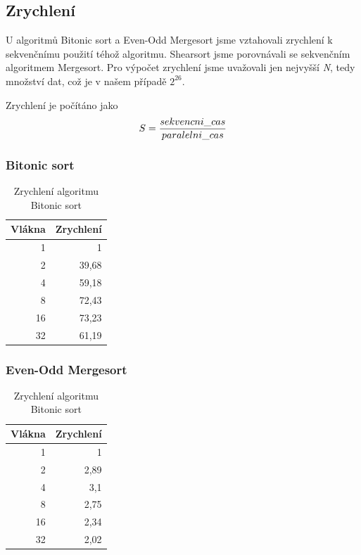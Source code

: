 \documentclass[12pt]{article}
\begin{document}
\subsection{Zrychlení}
U algoritmů Bitonic sort a Even-Odd Mergesort jsme vztahovali zrychlení k sekvenčnímu použití téhož algoritmu.
Shearsort jsme porovnávali se sekvenčním algoritmem Mergesort. Pro výpočet zrychlení jsme uvažovali jen
nejvyšší \emph{N}, tedy množství dat, což je v našem případě \(2^{26}\).

Zrychlení je počítáno jako $$S = {{sekvencni\_cas}\over{paralelni\_cas}}$$

\subsubsection{Bitonic sort}
\begin{table}[H]
\begin{center}
\begin{tabular}{|r|r|}
\hline Vlákna & Zrychlení \\ \hline
1	& 1 \\ \hline
2	& 39,68 \\ \hline
4	& 59,18 \\ \hline
8	& 72,43 \\ \hline
16	& 73,23 \\ \hline
32	& 61,19 \\ \hline
\end{tabular} 
\end{center}
\caption{Zrychlení algoritmu Bitonic sort}
\end{table}

\subsubsection{Even-Odd Mergesort}
\begin{table}[H]
\begin{center}
\begin{tabular}{|r|r|}
\hline Vlákna & Zrychlení \\ \hline
1  & 1      \\ \hline
2  & 2,89   \\ \hline
4  & 3,1    \\ \hline
8  & 2,75   \\ \hline
16 & 2,34   \\ \hline
32 & 2,02   \\ \hline
\end{tabular} 
\end{center}
\caption{Zrychlení algoritmu Bitonic sort}
\end{table}
\end{document}
